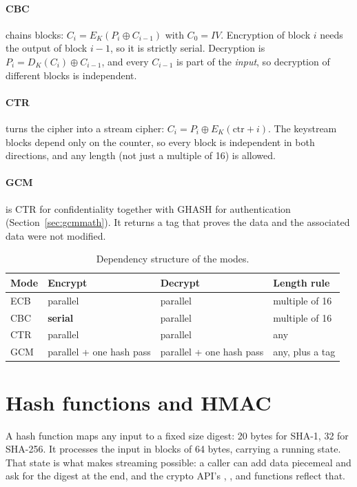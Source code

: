 \paragraph{CBC} chains blocks: $C_i = E_K(P_i \oplus C_{i-1})$ with $C_0 = IV$. Encryption of block $i$ needs the output of block $i-1$, so it is strictly serial. Decryption is $P_i = D_K(C_i) \oplus C_{i-1}$, and every $C_{i-1}$ is part of the \emph{input}, so decryption of different blocks is independent.

\paragraph{CTR} turns the cipher into a stream cipher: $C_i = P_i \oplus E_K(\text{ctr} + i)$. The keystream blocks depend only on the counter, so every block is independent in both directions, and any length (not just a multiple of 16) is allowed.

\paragraph{GCM} is CTR for confidentiality together with GHASH for authentication (Section~\ref{sec:gcmmath}). It returns a tag that proves the data and the associated data were not modified.

\begin{table}[ht]
\centering
\begin{tabularx}{\textwidth}{lXXX}
\toprule
Mode & Encrypt & Decrypt & Length rule \\
\midrule
ECB & parallel & parallel & multiple of 16 \\
CBC & \textbf{serial} & parallel & multiple of 16 \\
CTR & parallel & parallel & any \\
GCM & parallel + one hash pass & parallel + one hash pass & any, plus a tag \\
\bottomrule
\end{tabularx}
\caption{Dependency structure of the modes.}
\end{table}

\section{Hash functions and HMAC}

A hash function maps any input to a fixed size digest: 20 bytes for SHA-1, 32 for SHA-256. It processes the input in blocks of 64 bytes, carrying a running state. That state is what makes streaming possible: a caller can add data piecemeal and ask for the digest at the end, and the crypto API's , ,  and  functions reflect that.

